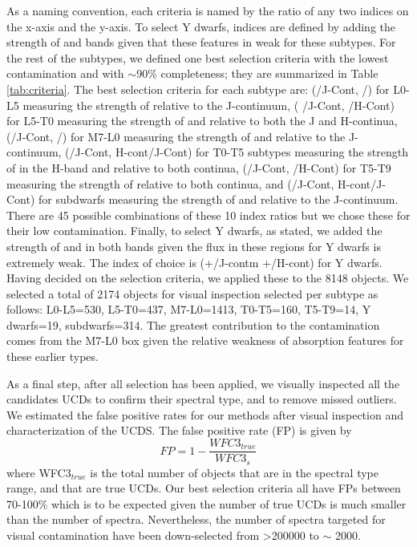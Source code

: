 \documentclass[manuscript]{aastex63}
\begin{document}
As a naming convention, each criteria is named by the ratio of any two indices on the x-axis and the y-axis. To select Y dwarfs, indices are defined by adding the strength of \wat and \meth bands given that these features in weak for these subtypes. For the rest of the subtypes, we defined one best selection criteria with the lowest contamination and with $\sim$90\% completeness; they are summarized in Table \ref{tab:criteria}. The best selection criteria for each subtype are: (/J-Cont,  /) for L0-L5 measuring the strength of \wat relative to the J-continuum, (  /J-Cont, \indxmeth/H-Cont) for L5-T0 measuring the strength of \wat and \meth relative to both the J and H-continua, (/J-Cont, \indxmeth/) for M7-L0 measuring the strength of \wat and \meth relative to the J-continuum, (/J-Cont, H-cont/J-Cont) for T0-T5 subtypes measuring the strength of \wat in the H-band and \meth relative to both continua,  (/J-Cont, \indxmeth/H-Cont) for T5-T9 measuring the strength of \meth relative to both continua, and (/J-Cont, H-cont/J-Cont) for subdwarfs measuring the strength of \wat and \meth relative to the J-continuum. There are 45 possible combinations of these 10 index ratios but we chose these for their low contamination. Finally, to select Y dwarfs, as stated, we added the strength of \wat and \meth in both bands given the flux in these regions for Y dwarfs is extremely weak. The index of choice is (+\indxmeth/J-contm +\indxmeth/H-cont) for Y dwarfs. Having decided on the selection criteria, we applied these to the 8148 objects. We selected a total of 2174 objects for visual inspection selected per subtype as follows: L0-L5=530, L5-T0=437, M7-L0=1413, T0-T5=160, T5-T9=14, Y dwarfs=19, subdwarfs=314. The greatest contribution to the contamination comes from the M7-L0 box given the relative weakness of absorption features for these earlier types. 

As a final step, after all selection has been applied, we visually inspected all the candidates UCDs to confirm their spectral type, and to remove missed outliers. We estimated the false positive rates for our methods after visual inspection and characterization of the UCDS. The false positive rate (FP) is given by \begin{equation}
FP=1-\frac{WFC3_{true}}{WFC3_{s}}
\end{equation} where WFC3$_{true}$ is the total number of objects that are in the spectral type range, and that are true UCDs. Our best selection criteria all have FPs between 70-100\% which is to be expected given the number of true UCDs is much smaller than the number of spectra. Nevertheless, the number of spectra targeted for visual contamination have been down-selected from \textgreater 200000 to $\sim$ 2000. 
\end{document}
